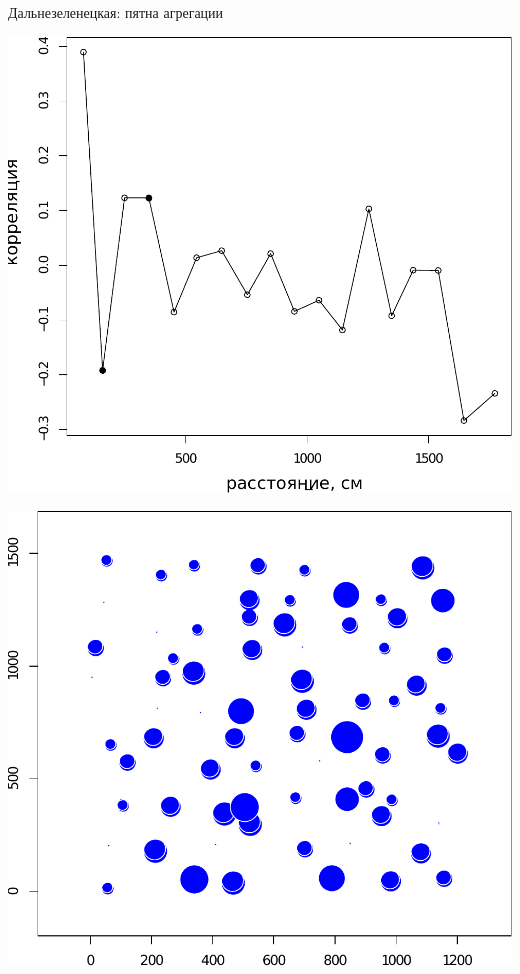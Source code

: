 \documentclass{beamer}
\begin{document}
\begin{frame}{Дальнезеленецкая: пятна агрегации}
	\begin{minipage}[t]{.7\linewidth}
 \begin{center}
		\includegraphics[width=\textwidth]{Plyazh0812_moran_N_Macoma_balthica_.pdf}
 \end{center}
	\end{minipage}
	\begin{minipage}[t]{.28\linewidth}
 \begin{center}
		\includegraphics[width=\textwidth]{Plyazh0812_N_Macoma_bubbles.pdf}
 \end{center}
	\end{minipage}
\end{frame}
\end{document}
